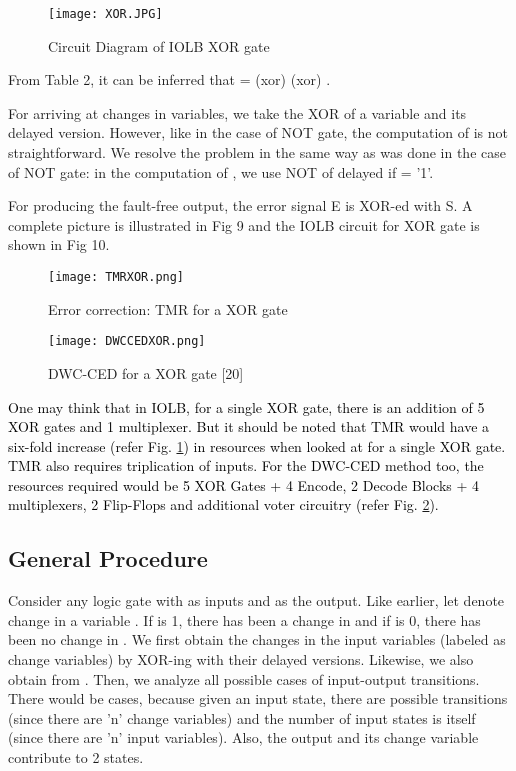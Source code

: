 \documentclass[10pt,journal,cspaper,compsoc]{IEEEtran}
\begin{document}
\begin{figure}[t]
  \caption{Circuit Diagram of IOLB XOR gate }
\texttt{[image: XOR.JPG]}
\end{figure}
From Table 2, it can be inferred that  =  (xor)  (xor) .

For arriving at changes in variables, we take the XOR of a variable and its delayed version. However, like in the case of NOT gate, the computation of  is not straightforward. We resolve the problem in the same way as was done in the case of NOT gate: in the computation of , we use NOT of delayed  if  = '1'.

For producing the fault-free output, the error signal E is XOR-ed with S. A complete picture is illustrated in Fig 9 and the IOLB circuit for XOR gate is shown in Fig 10.

\begin{figure}[t]
  \caption{Error correction: TMR for a XOR gate}\label{fig_tmr_xor}
  \centering
       \texttt{[image: TMRXOR.png]}
\end{figure}

\begin{figure}[t]
  \caption{DWC-CED for a XOR gate [20]}\label{fig_dwc_xor}
\texttt{[image: DWCCEDXOR.png]}
\end{figure}

\textcolor{black} {One may think that in IOLB, for a single XOR gate, there is an addition of 5 XOR gates and 1 multiplexer. But it should be noted that TMR would have a six-fold increase (refer Fig. \ref{fig_tmr_xor}) in resources when looked at for a single XOR gate. TMR also requires triplication of inputs. For the DWC-CED method too, the resources required would be 5 XOR Gates + 4 Encode, 2 Decode Blocks + 4 multiplexers, 2 Flip-Flops and additional voter circuitry (refer Fig. \ref{fig_dwc_xor}).}

\subsection{General Procedure}
{Consider any logic gate with  as inputs and  as the output. Like earlier, let  denote change in a variable . If  is 1, there has been a change in  and if  is 0, there has been no change in . We first obtain the changes in the input variables  (labeled as change variables) by XOR-ing  with their delayed versions. Likewise, we also obtain  from . Then, we analyze all possible cases of input-output transitions. There would be  cases, because given an input state, there are  possible transitions (since there are 'n' change variables) and the number of input states is itself  (since there are 'n' input variables). Also, the output  and its change variable  contribute to 2 states.}
\end{document}
